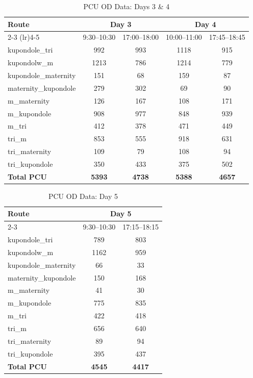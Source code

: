 \begin{table}[H]
    \centering
    \small
    \caption{PCU OD Data: Days 3 \& 4}
    \label{tab:pcu_days_3_4}
    \begin{tabular}{lcccc}
        \toprule
        \multirow{2}{*}{\textbf{Route}} & \multicolumn{2}{c}{\textbf{Day 3}} & \multicolumn{2}{c}{\textbf{Day 4}} \\
        \cmidrule(lr){2-3} \cmidrule(lr){4-5}
        & 9:30--10:30 & 17:00--18:00 & 10:00--11:00 & 17:45--18:45 \\
        \midrule
        kupondole\_tri & 992 & 993 & 1118 & 915 \\
        kupondolw\_m & 1213 & 786 & 1214 & 779 \\
        kupondole\_maternity & 151 & 68 & 159 & 87 \\
        maternity\_kupondole & 279 & 302 & 69 & 90 \\
        m\_maternity & 126 & 167 & 108 & 171 \\
        m\_kupondole & 908 & 977 & 848 & 939 \\
        m\_tri & 412 & 378 & 471 & 449 \\
        tri\_m & 853 & 555 & 918 & 631 \\
        tri\_maternity & 109 & 79 & 108 & 94 \\
        tri\_kupondole & 350 & 433 & 375 & 502 \\
        \midrule
        \textbf{Total PCU} & \textbf{5393} & \textbf{4738} & \textbf{5388} & \textbf{4657} \\
        \bottomrule
    \end{tabular}
\end{table}

\begin{table}[H]
    \centering
    \small
    \caption{PCU OD Data: Day 5}
    \label{tab:pcu_day_5}
    \begin{tabular}{lcc}
        \toprule
        \multirow{2}{*}{\textbf{Route}} & \multicolumn{2}{c}{\textbf{Day 5}} \\
        \cmidrule(lr){2-3}
        & 9:30--10:30 & 17:15--18:15 \\
        \midrule
        kupondole\_tri & 789 & 803 \\
        kupondolw\_m & 1162 & 959 \\
        kupondole\_maternity & 66 & 33 \\
        maternity\_kupondole & 150 & 168 \\
        m\_maternity & 41 & 30 \\
        m\_kupondole & 775 & 835 \\
        m\_tri & 422 & 418 \\
        tri\_m & 656 & 640 \\
        tri\_maternity & 89 & 94 \\
        tri\_kupondole & 395 & 437 \\
        \midrule
        \textbf{Total PCU} & \textbf{4545} & \textbf{4417} \\
        \bottomrule
    \end{tabular}
\end{table}
